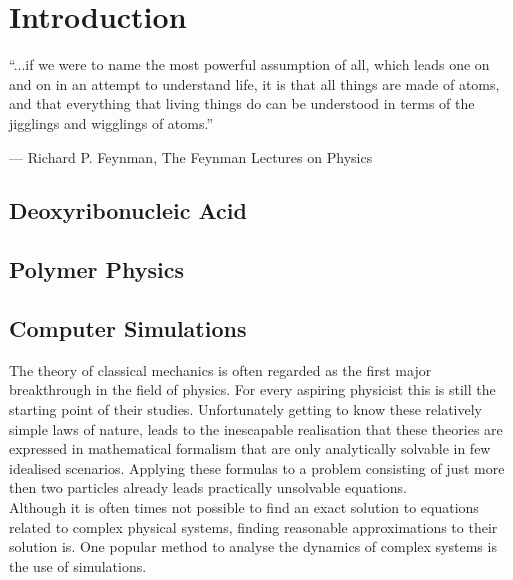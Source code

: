 \chapter{Introduction}
\vspace{-1cm}
\epigraphfontsize{\small\itshape}
\epigraph{“...if we were to name the most powerful assumption of all, which leads one on
and on in an attempt to understand life, it is that all things are made of atoms, and
that everything that living things do can be understood in terms of the jigglings and
wigglings of atoms.”}
{--- \textup{Richard P. Feynman}, The Feynman Lectures on Physics\cite{feynmanLectures}}

\section{Deoxyribonucleic Acid}

\section{Polymer Physics}

\newpage

\section{Computer Simulations}

The theory of classical mechanics is often regarded as the first major breakthrough in
the field of physics. For every aspiring physicist this is still the starting point of
their studies. Unfortunately getting to know these relatively simple laws of nature,
leads to the inescapable realisation that these theories are expressed in mathematical
formalism that are only analytically solvable in few idealised scenarios. Applying these
formulas to a problem consisting of just more then two particles already leads
practically unsolvable equations.\\

Although it is often times not possible to find an exact solution to equations
related to complex physical systems, finding reasonable approximations to their solution
is. One popular method to analyse the dynamics of complex systems is the use of
simulations.\\


